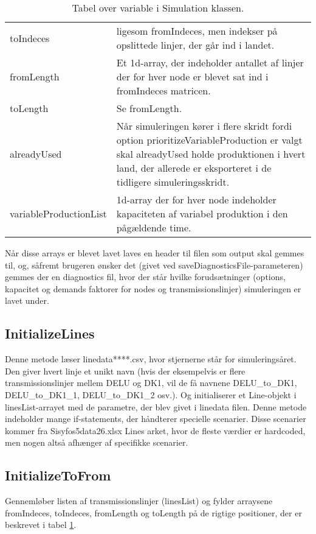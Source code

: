 \documentclass{article}
\begin{document}
\begin{table}
\begin{tabularx}{\textwidth}{lX}
    toIndeces & ligesom fromIndeces, men indekser på opslittede linjer, der går ind i landet.\\
    fromLength & Et 1d-array, der indeholder antallet af linjer der for hver node er blevet sat ind i fromIndeces matricen.\\
    toLength & Se fromLength.\\
    alreadyUsed & Når simuleringen kører i flere skridt fordi option prioritizeVariableProduction er valgt skal alreadyUsed holde produktionen i hvert land, der allerede er eksporteret i de tidligere simuleringsskridt. \\
    variableProductionList & 1d-array der for hver node indeholder kapaciteten af variabel produktion i den pågældende time. 
    \bottomrule
    \end{tabularx}%
  \label{tab:arrays}%
  \caption{Tabel over variable i Simulation klassen.}
\end{table}%
Når disse arrays er blevet lavet laves en header til filen som output skal gemmes til, og, såfremt brugeren ønsker det (givet ved saveDiagnosticsFile-parameteren) gemmes der en diagnostics fil, hvor der står hvilke forudsætninger (options, kapacitet og demands faktorer for nodes og transmissionslinjer) simuleringen er lavet under. 

\subsection{InitializeLines}
Denne metode læser linedata****.csv, hvor stjernerne står for simuleringsåret. Den giver hvert linje et unikt navn (hvis der eksempelvis er flere transmissionslinjer mellem DELU og DK1, vil de få navnene DELU\_to\_DK1, DELU\_to\_DK1\_1, DELU\_to\_DK1\_2 osv.). Og initialiserer et Line-objekt i linesList-arrayet med de parametre, der blev givet i linedata filen. Denne metode indeholder mange if-statements, der håndterer specielle scenarier. Disse scenarier kommer fra Sisyfos5data26.xlsx Lines arket, hvor de fleste værdier er hardcoded, men nogen altså afhænger af specifikke scenarier.  

\subsection{InitializeToFrom}
Gennemløber listen af transmissionslinjer (linesList) og fylder arraysene fromIndeces, toIndeces, fromLength og toLength på de rigtige positioner, der er beskrevet i tabel \ref{tab:arrays}.
\end{document}

